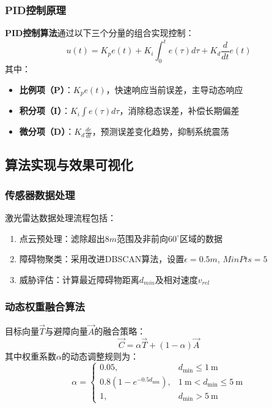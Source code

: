\subsubsection{PID控制原理}
	\textbf{PID控制算法}通过以下三个分量的组合实现控制：
		\[
		u(t) = K_p e(t) + K_i \int_0^t e(\tau) d\tau + K_d \frac{d}{dt} e(t)
		\]
其中：
\begin{itemize}
    \item \textbf{比例项（P）}：$K_p e(t)$，快速响应当前误差，主导动态响应
    \item \textbf{积分项（I）}：$K_i \int e(\tau)d\tau$，消除稳态误差，补偿长期偏差
    \item \textbf{微分项（D）}：$K_d \frac{de}{dt}$，预测误差变化趋势，抑制系统震荡
\end{itemize}

\subsection{算法实现与效果可视化}

\subsubsection{传感器数据处理}
激光雷达数据处理流程包括：
\begin{enumerate}
	\item 点云预处理：滤除超出$8m$范围及非前向$60^\circ$区域的数据
	\item 障碍物聚类：采用改进DBSCAN算法，设置$\epsilon=0.5m$, $MinPts=5$
	\item 威胁评估：计算最近障碍物距离$d_{min}$及相对速度$v_{rel}$
\end{enumerate}

\subsubsection{动态权重融合算法}
目标向量$\vec{T}$与避障向量$\vec{A}$的融合策略：
\begin{equation}
	\vec{C} = \alpha \vec{T} + (1-\alpha)\vec{A}
\end{equation}
其中权重系数$\alpha$的动态调整规则为：
\begin{equation}
    \alpha = 
    \begin{cases}
        0.05, & d_{\text{min}} \leq 1\ \text{m} \\
        0.8(1 - e^{-0.5d_{\text{min}}}), & 1\ \text{m} < d_{\text{min}} \leq 5\ \text{m} \\
        1, & d_{\text{min}} > 5\ \text{m}
    \end{cases}
\end{equation}

